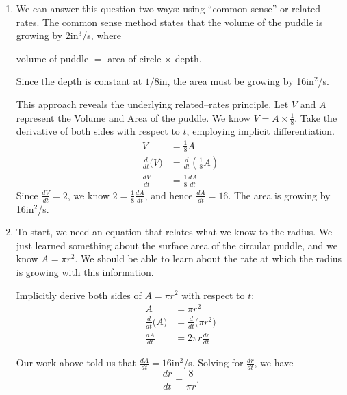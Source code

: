 {\begin{enumerate}
\item We can answer this question two ways: using ``common sense'' or related rates. The common sense method states that the volume of the puddle is growing by $2$in$^3$/s, where 
	\begin{center} volume of puddle $=$ area of circle $\times$ depth.\end{center}
Since the depth is constant at $1/8$in, the area must be growing by 16in$^2$/s.

This approach reveals the underlying related--rates principle. Let $V$ and $A$ represent the Volume and Area of the puddle. We know $V= A\times \frac18$. Take the derivative of both sides with respect to $t$, employing implicit differentiation.
\begin{align*}
V &= \frac18A\\
\frac{d}{dt}\big(V\big) &= \frac{d}{dt}\left(\frac18A\right)\\
\frac{dV}{dt} &=	\frac18\frac{dA}{dt}
\end{align*} 
Since $\frac{dV}{dt} = 2$, we know $2 = \frac18\frac{dA}{dt}$, and hence $\frac{dA}{dt} = 16$. The area is growing by 16in$^2$/s.

\drawexampleline
\item		To start, we need an equation that relates what we know to the radius. We just learned something about the surface area of the circular puddle, and we know $A = \pi r^2$. We should be able to learn about the rate at which the radius is growing with this information. 

Implicitly derive both sides of $A=\pi r^2$ with respect to $t$:
\begin{align*}
	A 	&= \pi r^2 \\
	\frac{d}{dt}\big(A\big) &= \frac{d}{dt}\big(\pi r^2\big)\\
	\frac{dA}{dt} &= 2\pi r\frac{dr}{dt}
\end{align*}

Our work above told us that $\frac{dA}{dt} = 16$in$^2$/s. Solving for $\frac{dr}{dt}$, we have $$\frac{dr}{dt} = \frac{8}{\pi r}.$$


\end{enumerate}}
